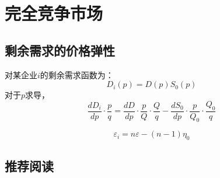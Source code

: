 \chapter{完全竞争市场}
\label{sec:competitive-markets}





\section{剩余需求的价格弹性}

对某企业$i$的剩余需求函数为：
\begin{equation}
D_i(p) = D(p) S_0(p)
\end{equation}
对于$p$求导，
\begin{equation}
\frac{{d{D_i}}}{{dp}}\cdot\frac{p}{q} = \frac{{dD}}{{dp}}\cdot\frac{p}{Q}\cdot\frac{Q}{q} - \frac{{d{S_0}}}{{dp}}\cdot\frac{p}{{{Q_0}}}\cdot\frac{{{Q_0}}}{q}
\end{equation}

\begin{equation}
{\varepsilon _i} = n\varepsilon  - (n - 1){\eta _0}
\end{equation}



\section*{推荐阅读}
